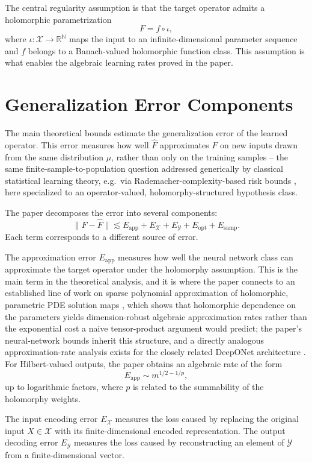 The central regularity assumption is that the target operator admits a
holomorphic parametrization
\[
    F = f \circ \iota,
\]
where $\iota : \mathcal{X} \to \mathbb{R}^{\mathbb{N}}$ maps the input to an infinite-dimensional parameter sequence and $f$ belongs to a Banach-valued holomorphic function class. This assumption is what enables the algebraic learning rates proved in the paper.

\section{Generalization Error Components}

The main theoretical bounds estimate the generalization error of the learned operator. This error measures how well $\widehat{F}$ approximates $F$ on new inputs drawn from the same distribution $\mu$, rather than only on the training samples -- the same finite-sample-to-population question addressed generically by classical statistical learning theory, e.g.\ via Rademacher-complexity-based risk bounds \cite{bartlettmendelson2002}, here specialized to an operator-valued, holomorphy-structured hypothesis class.

The paper decomposes the error into several components:
\[
    \|F - \widehat{F}\|
    \lesssim
    E_{\mathrm{app}}
    +
    E_{\mathcal{X}}
    +
    E_{\mathcal{Y}}
    +
    E_{\mathrm{opt}}
    +
    E_{\mathrm{samp}}.
\]
Each term corresponds to a different source of error.

The approximation error $E_{\mathrm{app}}$ measures how well the neural network class can approximate the target operator under the holomorphy assumption. This is the main term in the theoretical analysis, and it is where the paper connects to an established line of work on sparse polynomial approximation of holomorphic, parametric PDE solution maps \cite{cohendeVoreschwab2011,chkifa2015breaking}, which shows that holomorphic dependence on the parameters yields dimension-robust algebraic approximation rates rather than the exponential cost a naive tensor-product argument would predict; the paper's neural-network bounds inherit this structure, and a directly analogous approximation-rate analysis exists for the closely related DeepONet architecture \cite{lanthaler2022deeponet}. For Hilbert-valued outputs, the paper obtains an algebraic rate of the form
\[
    E_{\mathrm{app}} \sim m^{1/2 - 1/p},
\]
up to logarithmic factors, where $p$ is related to the summability of the
holomorphy weights.

The input encoding error $E_{\mathcal{X}}$ measures the loss caused by replacing the original input $X \in \mathcal{X}$ with its finite-dimensional encoded representation. The output decoding error $E_{\mathcal{Y}}$ measures the loss caused by reconstructing an element of $\mathcal{Y}$ from a finite-dimensional vector.

